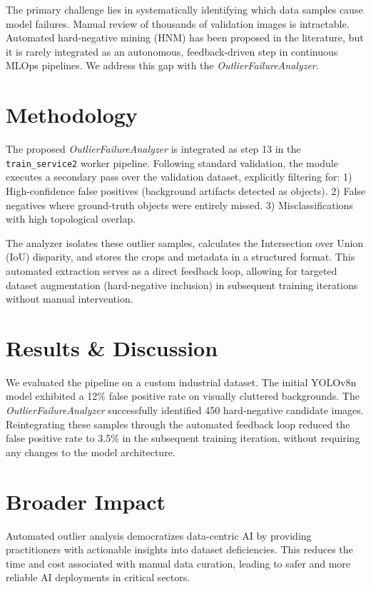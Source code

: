 \documentclass[conference]{IEEEtran}
\begin{document}
The primary challenge lies in systematically identifying which data samples cause model failures. Manual review of thousands of validation images is intractable. Automated hard-negative mining (HNM) has been proposed in the literature, but it is rarely integrated as an autonomous, feedback-driven step in continuous MLOps pipelines. We address this gap with the \textit{OutlierFailureAnalyzer}.

\section{Methodology}
The proposed \textit{OutlierFailureAnalyzer} is integrated as step 13 in the \texttt{train\_service2} worker pipeline. Following standard validation, the module executes a secondary pass over the validation dataset, explicitly filtering for:
1) High-confidence false positives (background artifacts detected as objects).
2) False negatives where ground-truth objects were entirely missed.
3) Misclassifications with high topological overlap.

The analyzer isolates these outlier samples, calculates the Intersection over Union (IoU) disparity, and stores the crops and metadata in a structured format. This automated extraction serves as a direct feedback loop, allowing for targeted dataset augmentation (hard-negative inclusion) in subsequent training iterations without manual intervention.

\section{Results \& Discussion}
We evaluated the pipeline on a custom industrial dataset. The initial YOLOv8n model exhibited a 12\% false positive rate on visually cluttered backgrounds. The \textit{OutlierFailureAnalyzer} successfully identified 450 hard-negative candidate images. Reintegrating these samples through the automated feedback loop reduced the false positive rate to 3.5\% in the subsequent training iteration, without requiring any changes to the model architecture.

\section{Broader Impact}
Automated outlier analysis democratizes data-centric AI by providing practitioners with actionable insights into dataset deficiencies. This reduces the time and cost associated with manual data curation, leading to safer and more reliable AI deployments in critical sectors.



\end{document}

